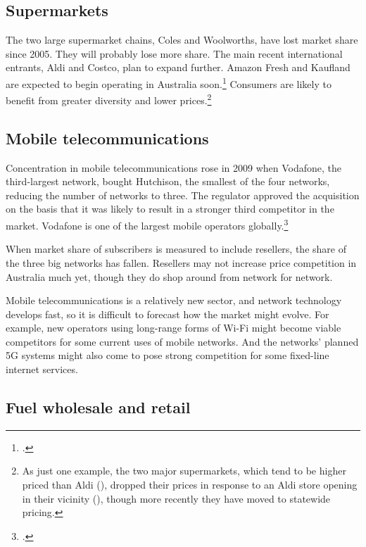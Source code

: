 \subsection{Supermarkets}

The two large supermarket chains, Coles and Woolworths, have lost market share since 2005. They will probably lose more share. The main recent international entrants, Aldi and Costco, plan to expand further. Amazon Fresh and Kaufland are expected to begin operating in Australia soon.\footcites{Kaufland_2017}{AmazonFresh_2017} %
Consumers are likely to benefit from greater diversity and lower prices.\footnote{As just one example, the two major supermarkets, which tend to be higher priced than Aldi (\textcite{Choice-supermarket-want-to-spend-less}), dropped their prices in response to an Aldi store opening in their vicinity (\textcite{ACCC-grocery-2008}), though more recently they have moved to statewide pricing.}


\subsection{Mobile telecommunications}

Concentration in mobile telecommunications rose in 2009 when Vodafone, the third-largest network, bought Hutchison, the smallest of the four networks, reducing the number of networks to three. The regulator approved the acquisition on the basis that it was likely to result in a stronger third competitor in the market. Vodafone is one of the largest mobile operators globally.\footcite{ACCC_mobile_2009} 

When market share of subscribers is measured to include resellers, the share of the three big networks has fallen. Resellers may not increase price competition in Australia much yet, though they do shop around from network for network. 

Mobile telecommunications is a relatively new sector, and network technology develops fast, so it is difficult to forecast how the market might evolve. For example, new operators using long-range forms of Wi-Fi might become viable competitors for some current uses of mobile networks. And the networks' planned 5G systems might also come to pose strong competition for some fixed-line internet services.

\subsection{Fuel wholesale and retail}

